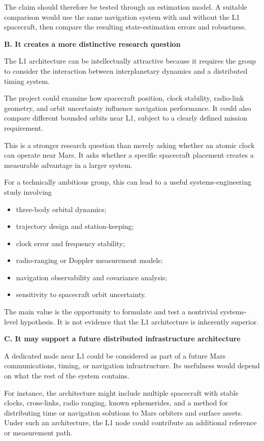 The claim should therefore be tested through an estimation model.
A suitable comparison would use the same navigation system with
and without the L1 spacecraft, then compare the resulting
state-estimation errors and robustness.

\textbf{B. It creates a more distinctive research question}

The L1 architecture can be intellectually attractive because it
requires the group to consider the interaction between
interplanetary dynamics and a distributed timing system.

The project could examine how spacecraft position, clock stability,
radio-link geometry, and orbit uncertainty influence navigation
performance. It could also compare different bounded orbits near
L1, subject to a clearly defined mission requirement.

This is a stronger research question than merely asking whether
an atomic clock can operate near Mars. It asks whether a specific
spacecraft placement creates a measurable advantage in a larger
system.

For a technically ambitious group, this can lead to a useful
systems-engineering study involving

\begin{itemize}
	\item three-body orbital dynamics;
	\item trajectory design and station-keeping;
	\item clock error and frequency stability;
	\item radio-ranging or Doppler measurement models;
	\item navigation observability and covariance analysis;
	\item sensitivity to spacecraft orbit uncertainty.
\end{itemize}

The main value is the opportunity to formulate and test a
nontrivial systems-level hypothesis. It is not evidence that
the L1 architecture is inherently superior.

\textbf{C. It may support a future distributed infrastructure
	architecture}

A dedicated node near L1 could be considered as part of a future
Mars communications, timing, or navigation infrastructure.
Its usefulness would depend on what the rest of the system
contains.

For instance, the architecture might include multiple spacecraft
with stable clocks, cross-links, radio ranging, known ephemerides,
and a method for distributing time or navigation solutions to
Mars orbiters and surface assets. Under such an architecture,
the L1 node could contribute an additional reference or
measurement path.

